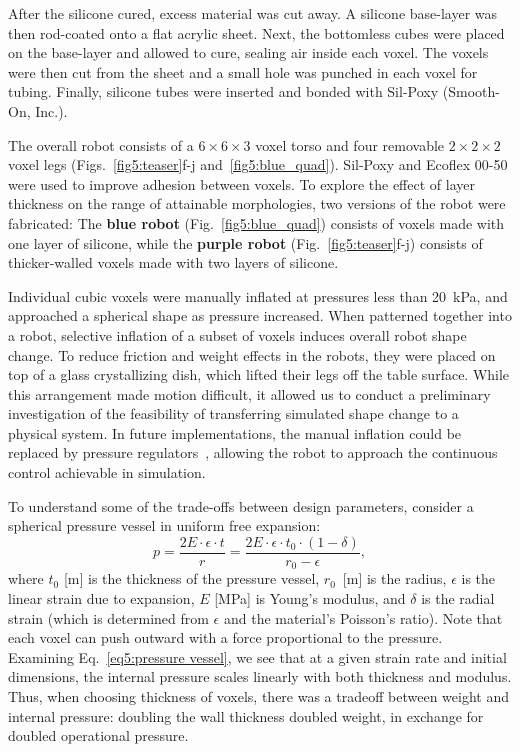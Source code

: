 After the silicone cured, excess material was cut away. A silicone base-layer was then rod-coated onto a flat acrylic sheet. Next, the bottomless cubes were placed on the base-layer and allowed to cure, sealing air inside each voxel. The voxels were then cut from the sheet and a small hole was punched in each voxel for tubing. Finally, silicone tubes were inserted and bonded with Sil-Poxy (Smooth-On, Inc.).

The overall robot consists of a $6\times6\times3$ voxel torso and four removable $2\times2\times2$ voxel legs (Figs.~\ref{fig5:teaser}f-j  and~\ref{fig5:blue_quad}). 
Sil-Poxy and Ecoflex 00-50 were used to improve adhesion between voxels. 
To explore the effect of layer thickness on the range of attainable morphologies,
two versions of the robot were fabricated:
The {\color{blue}\textbf{blue robot}} (Fig.~\ref{fig5:blue_quad}) consists of voxels made with one layer of silicone, while the {\color{purple}\textbf{purple robot}} \mbox{(Fig.~\ref{fig5:teaser}f-j)} consists of thicker-walled voxels made with two layers of silicone. 

Individual cubic voxels were manually inflated at pressures less than 20~kPa, and approached a spherical shape as pressure increased. 
When patterned together into a robot, selective inflation of a subset of voxels induces overall robot shape change. 
To reduce friction and weight effects in the robots, they were placed on top of a glass crystallizing dish, which lifted their legs off the table surface.
While this arrangement made motion difficult, it allowed us to conduct a preliminary investigation of the feasibility of transferring simulated shape change to a physical system. 
In future implementations, the manual inflation could be replaced by pressure regulators~\cite{booth_addressable_2018}, allowing the robot to approach the continuous control achievable in simulation.

To understand some of the trade-offs between design parameters, consider a spherical pressure vessel in uniform free expansion:
\begin{equation}
    \label{eq5:pressure vessel}
    p=\frac{2 E \cdot \epsilon \cdot t}{r} = \frac{2 E \cdot \epsilon \cdot t_0 \cdot (1-\delta)}{r_0-\epsilon},
\end{equation}
where $t_0$ [m] is the thickness of the pressure vessel, $r_0$~[m] is the radius, $\epsilon$ is the linear strain due to expansion, $E$ [MPa] is Young's modulus, and $\delta$ is the radial strain (which is determined from $\epsilon$ and the material's Poisson's ratio).
Note that each voxel can push outward with a force proportional to the pressure. Examining Eq.~\ref{eq5:pressure vessel}, we see that at a given strain rate and initial dimensions, the internal pressure scales linearly with both thickness and modulus. Thus, when choosing thickness of voxels, there was a tradeoff between weight and internal pressure: doubling the wall thickness doubled weight, in exchange for doubled operational pressure.



